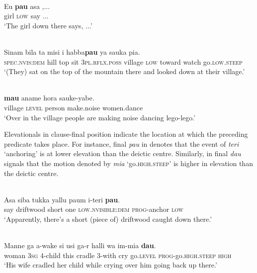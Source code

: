 \documentclass[output=paper]{LSP/langsci}
\begin{document}
\ea%
\label{ex:7:33}
 \\
\gll   Eu  \textbf{pau} asa{\ng} ,...\\
   girl  \textsc{low} say ... \\
\glt   `The girl down there says, ...' 
\z









\ea%
\label{ex:7:34}
 \\
\gll  Sinam   bila    ta{\ng}    misi{\ng}  i  habba{\ng}\textbf{pau}   ya     sauka{\ng}  pia. \\
    \textsc{spec.nvis:dem} hill  top  sit  \textsc{3pl.rflx.poss} village  \textsc{low}   toward  watch  go\textsc{.low.steep} \\
\glt   `(They) sat on the top of the mountain there and looked down at their village.'
\z

\ea%
\label{ex:7:35}
 \\
 \textbf{mau} {aname  hora{\ng}}  sauke-yabe.\\
  village  \textsc{level} person  make.noise  women.dance \\
\glt  `Over in the village people are making noise dancing lego-lego.' 
\z


Elevationals in clause-final position indicate the location at which the preceding predicate takes place. For instance, final \textit{pau} in  denotes that the event of \textit{teri} `anchoring' is at lower elevation than the deictic centre. Similarly, in  final \textit{dau} signals that the motion denoted by \textit{mia} `go.\textsc{high.steep}' is higher in elevation than the deictic centre. 



\ea%
\label{ex:7:36}
 \\
\gll  Asa{\ng}  siba{\ng}  tukka  yallu  paum  i-teri \textbf{pau}.\\
  say  driftwood  short  one  \textsc{low.nvisible:dem} \textsc{prog}{}-anchor  \textsc{low} \\
\glt  `Apparently, there's a short (piece of) driftwood caught down there.'
\z
     

\ea%
\label{ex:7:37}
 \\
\gll Manne   ga{\ng}  a-wake  si{\ng}  usi{\ng}  ga-r  halli  wa  im-mia  \textbf{dau}. \\
   woman  \textsc{3sg} 4-child  this    cradle  3-with  cry  go.\textsc{level}   \textsc{prog}{}-go.\textsc{high.steep} \textsc {high   } \\
\glt  `His wife cradled her child while crying over him going back up there.'
\z
\end{document}
